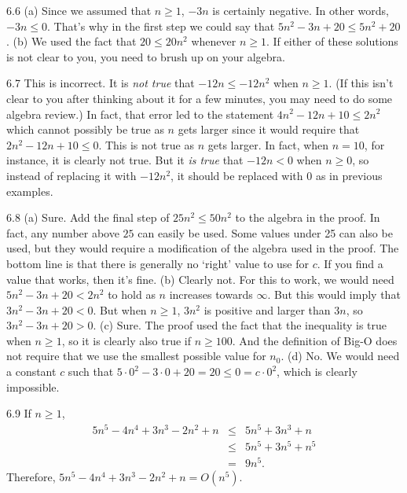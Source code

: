 \begin{Answer}{6.6}
(a) Since we assumed that $n\geq 1$, $-3n$ is certainly negative.  In other words,
$-3n\leq 0$.  That's why in the first step we could say that $5n^2-3n+20\leq 5n^2+20$.
(b) We used the fact that $20\leq 20n^2$ whenever $n\geq 1$.
If either of these solutions is not clear to you,
you need to brush up on your algebra.
\end{Answer}
\begin{Answer}{6.7}
This is incorrect.
It is {\em not true} that $-12n\leq -12n^2$ when $n\geq 1$.
(If this isn't clear to you after thinking about it for a few minutes, you may need to
do some algebra review.)
In fact, that error led to the statement
$4 n^{2} - 12n + 10\leq 2n^2$ which cannot possibly be true as $n$ gets larger
since it would require that $2n^2-12n+10\leq 0$.
This is not true as $n$ gets larger.
In fact, when $n=10$, for instance, it is clearly not true.
But it {\em is true} that $-12n<0$ when $n\geq 0$, so instead of replacing it
with $-12n^2$, it should be replaced with $0$ as in previous examples.
\end{Answer}
\begin{Answer}{6.8}
(a) Sure.  Add the final step of $25n^2\leq 50n^2$ to the algebra in the proof.
In fact, any number above $25$ can easily be used.
Some values under 25 can also be used, but they would require a modification
of the algebra used in the proof.
The bottom line is that there is generally no `right' value to
use for $c$.  If you find a value that works, then it's fine.
(b)  Clearly not.  For this to work, we would need
$5n^2-3n+20<2n^2$ to hold as $n$ increases towards $\infty$.
But this would imply that $3n^2-3n+20<0$.
But when $n\geq 1$, $3n^2$ is positive and larger than $3n$, so
$3n^2-3n+20>0$.
(c) Sure.  The proof used the fact that the inequality is true when $n\geq 1$,
so it is clearly also true if $n\geq 100$.  And the definition of Big-O does
not require that we use the smallest possible value for $n_0$.
(d) No.  We would need a constant $c$ such that $5\cdot 0^2-3\cdot 0 + 20 = 20\leq 0= c\cdot 0^2$,
which is clearly impossible.
\end{Answer}
\begin{Answer}{6.9}
If $n\geq 1$,
\begin{eqnarray*}
5n^{5} -4n^4 + 3n^3 - 2n^2 +n
&\leq&5n^{5} + 3n^3 +n\\
&\leq&5n^{5} + 3n^5 +n^5\\
&=&9n^5.
\end{eqnarray*}
Therefore, $5n^{5} -4n^4 + 3n^3 - 2n^2 +n=O(n^5)$.
\end{Answer}
